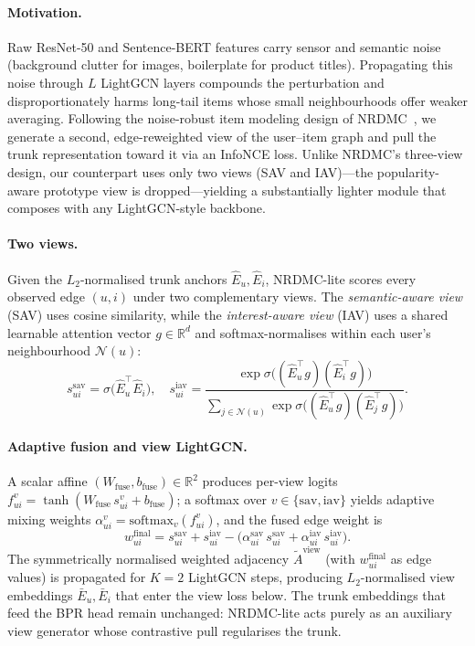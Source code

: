 \documentclass[conference]{IEEEtran}
\begin{document}
\paragraph{Motivation.} Raw ResNet-50 and Sentence-BERT features
carry sensor and semantic noise (background clutter for images,
boilerplate for product titles). Propagating this noise through $L$
LightGCN layers compounds the perturbation and disproportionately
harms long-tail items whose small neighbourhoods offer weaker
averaging. Following the noise-robust item modeling design of
NRDMC~\cite{gong2026noise}, we generate a second, edge-reweighted
view of the user--item graph and pull the trunk representation
toward it via an InfoNCE loss. Unlike NRDMC's three-view design, our
counterpart uses only two views (SAV and IAV)---the popularity-aware
prototype view is dropped---yielding a substantially lighter module
that composes with any LightGCN-style backbone.

\paragraph{Two views.} Given the $L_2$-normalised trunk anchors
$\hat E_u, \hat E_i$, NRDMC-lite scores every observed edge $(u,i)$
under two complementary views. The \emph{semantic-aware view} (SAV)
uses cosine similarity, while the \emph{interest-aware view} (IAV)
uses a shared learnable attention vector $g\in\mathbb{R}^{d}$ and
softmax-normalises within each user's neighbourhood $\mathcal{N}(u)$:
\begin{equation}
s^{\text{sav}}_{ui} = \sigma\!\big(\hat E_u^{\top}\hat E_i\big),\quad
s^{\text{iav}}_{ui} =
\frac{\exp\!\sigma\!\big((\hat E_u^{\top}g)(\hat E_i^{\top}g)\big)}
     {\sum_{j\in\mathcal{N}(u)}
       \exp\!\sigma\!\big((\hat E_u^{\top}g)(\hat E_j^{\top}g)\big)}.
\label{eq:saviav}
\end{equation}

\paragraph{Adaptive fusion and view LightGCN.} A scalar affine
$(W_{\text{fuse}}, b_{\text{fuse}}) \in \mathbb{R}^{2}$ produces
per-view logits
$f^{v}_{ui} = \tanh(W_{\text{fuse}}\, s^{v}_{ui} + b_{\text{fuse}})$;
a softmax over $v\in\{\text{sav},\text{iav}\}$ yields adaptive mixing
weights $\alpha^{v}_{ui} = \mathrm{softmax}_{v}(f^{v}_{ui})$, and the
fused edge weight is
\begin{equation}
w^{\text{final}}_{ui} = s^{\text{sav}}_{ui} + s^{\text{iav}}_{ui}
    - \big(\alpha^{\text{sav}}_{ui}\, s^{\text{sav}}_{ui}
       + \alpha^{\text{iav}}_{ui}\, s^{\text{iav}}_{ui}\big).
\label{eq:fuse}
\end{equation}
The symmetrically normalised weighted adjacency $\tilde A^{\text{view}}$
(with $w^{\text{final}}_{ui}$ as edge values) is propagated for
$K{=}2$ LightGCN steps, producing $L_2$-normalised view embeddings
$\bar E_u, \bar E_i$ that enter the view loss below. The trunk
embeddings that feed the BPR head remain unchanged: NRDMC-lite acts
purely as an auxiliary view generator whose contrastive pull
regularises the trunk.
\end{document}
